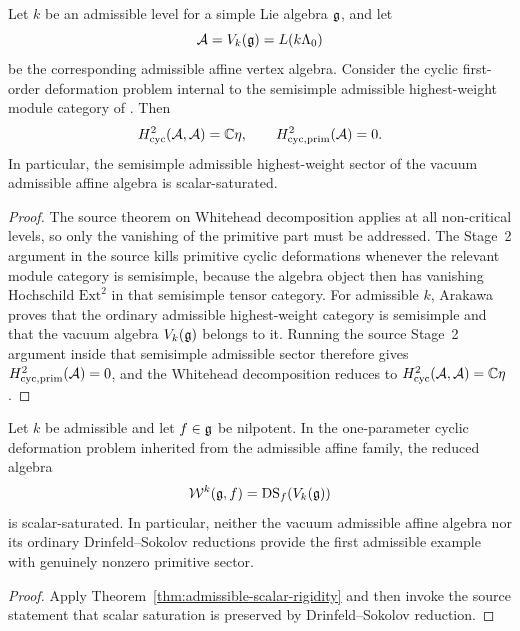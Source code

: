 \begin{theorem}
\label{thm:admissible-scalar-rigidity}
Let $k$ be an admissible level for a simple Lie algebra $\mathfrak{g}$, and let
\[
\mathcal{A}=V_k(\mathfrak{g})=L(k\Lambda_0)
\]
be the corresponding admissible affine vertex algebra.  Consider the cyclic
first-order deformation problem internal to the semisimple admissible
highest-weight module category of \cite{Arakawa2016RationalAdmissible}.  Then
\[
H^2_{\mathrm{cyc}}(\mathcal{A},\mathcal{A})=\mathbb{C}\eta,
\qquad
H^2_{\mathrm{cyc,prim}}(\mathcal{A})=0.
\]
In particular, the semisimple admissible highest-weight sector of the vacuum
admissible affine algebra is scalar-saturated.
\end{theorem}

\begin{proof}
The source theorem on Whitehead decomposition applies at all non-critical
levels, so only the vanishing of the primitive part must be addressed.  The
Stage~2 argument in the source kills primitive cyclic deformations whenever the
relevant module category is semisimple, because the algebra object then has
vanishing Hochschild $\mathrm{Ext}^2$ in that semisimple tensor category.  For
admissible $k$, Arakawa proves that the ordinary admissible highest-weight
category is semisimple and that the vacuum algebra $V_k(\mathfrak{g})$ belongs to it.
Running the source Stage~2 argument inside that semisimple admissible sector
therefore gives $H^2_{\mathrm{cyc,prim}}(\mathcal{A})=0$, and the Whitehead decomposition
reduces to $H^2_{\mathrm{cyc}}(\mathcal{A},\mathcal{A})=\mathbb{C}\eta$.\end{proof}

\begin{corollary}
\label{cor:ds-not-first-frontier}
Let $k$ be admissible and let $f\in \mathfrak{g}$ be nilpotent.  In the one-parameter
cyclic deformation problem inherited from the admissible affine family, the
reduced algebra
\[
\mathcal{W}^k(\mathfrak{g},f)=\mathrm{DS}_f(V_k(\mathfrak{g}))
\]
is scalar-saturated.  In particular, neither the vacuum admissible affine
algebra nor its ordinary Drinfeld--Sokolov reductions provide the first
admissible example with genuinely nonzero primitive sector.
\end{corollary}

\begin{proof}
Apply Theorem~\ref{thm:admissible-scalar-rigidity} and then invoke the source
statement that scalar saturation is preserved by Drinfeld--Sokolov reduction.\end{proof}

